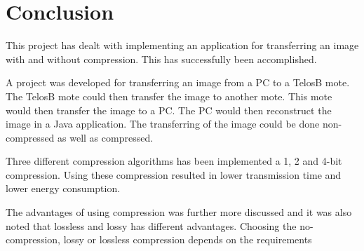 \chapter{Conclusion}
\label{chp:conc}

This project has dealt with implementing an application for transferring an image with and without compression. This has successfully been accomplished.

A project was developed for transferring an image from a PC to a TelosB mote. The TelosB mote could then transfer the image to another mote. This mote would then transfer the image to a PC. The PC would then reconstruct the image in a Java application. The transferring of the image could be done non-compressed as well as compressed. 

Three different compression algorithms has been implemented a 1, 2 and 4-bit compression. Using these compression resulted in lower transmission time and lower energy consumption.  

The advantages of using compression was further more discussed and it was also noted that lossless and lossy has different advantages. Choosing the no-compression, lossy or lossless compression depends on the requirements